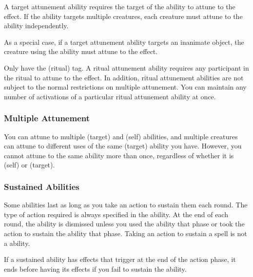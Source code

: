                  A target attunement ability requires the target of the ability to attune to the effect.
                If the ability targets multiple creatures, each creature must attune to the ability independently.

                As a special case, if a target attunement ability targets an inanimate object, the creature using the ability must attune to the effect.

                 Only  have the  (ritual) tag.
                A ritual attunement ability requires any participant in the ritual to attune to the effect.
                In addition, ritual attunement abilities are not subject to the normal restrictions on multiple attunement.
                You can maintain any number of activations of a particular ritual attunement ability at once.

            \subsubsection{Multiple Attunement}
                You can attune to multiple  (target) and  (self) abilities, and multiple creatures can attune to different uses of the same  (target) ability you have.
                However, you cannot attune to the same ability more than once, regardless of whether it is  (self) or  (target).

        \subsubsection{Sustained Abilities}\label{Sustained Abilities}
            Some abilities last as long as you take an action to sustain them each round.
            The type of action required is always specified in the ability.
            At the end of each round, the ability is dismissed unless you used the ability that phase or took the action to sustain the ability that phase.
            Taking an action to sustain a spell is not a  ability.

            If a sustained ability has effects that trigger at the end of the action phase, it ends before having its effects if you fail to sustain the ability.

